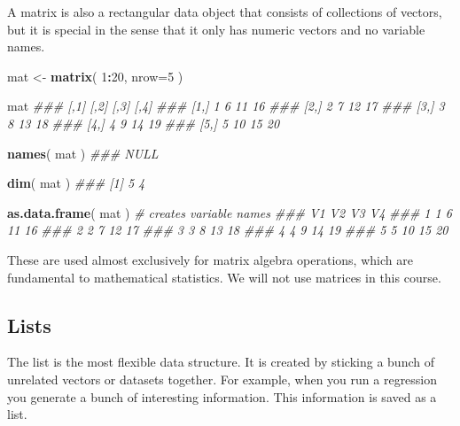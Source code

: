 \documentclass[]{book}
\newenvironment{Shaded}{\begin{snugshade}}{\end{snugshade}}
\newcommand{\CommentTok}[1]{\textcolor[rgb]{0.56,0.35,0.01}{\textit{#1}}}
\newcommand{\DataTypeTok}[1]{\textcolor[rgb]{0.13,0.29,0.53}{#1}}
\newcommand{\DecValTok}[1]{\textcolor[rgb]{0.00,0.00,0.81}{#1}}
\newcommand{\KeywordTok}[1]{\textcolor[rgb]{0.13,0.29,0.53}{\textbf{#1}}}
\newcommand{\NormalTok}[1]{#1}
\newcommand{\OperatorTok}[1]{\textcolor[rgb]{0.81,0.36,0.00}{\textbf{#1}}}
\newcommand{\StringTok}[1]{\textcolor[rgb]{0.31,0.60,0.02}{#1}}
\theoremstyle{definition}
\theoremstyle{definition}
\theoremstyle{definition}
\theoremstyle{remark}
\begin{document}
A matrix is also a rectangular data object that consists of collections
of vectors, but it is special in the sense that it only has numeric
vectors and no variable names.

\begin{Shaded}
\begin{Highlighting}[]

\NormalTok{mat <-}\StringTok{ }\KeywordTok{matrix}\NormalTok{( }\DecValTok{1}\OperatorTok{:}\DecValTok{20}\NormalTok{, }\DataTypeTok{nrow=}\DecValTok{5}\NormalTok{ )}

\NormalTok{mat}
\CommentTok{###      [,1] [,2] [,3] [,4]}
\CommentTok{### [1,]    1    6   11   16}
\CommentTok{### [2,]    2    7   12   17}
\CommentTok{### [3,]    3    8   13   18}
\CommentTok{### [4,]    4    9   14   19}
\CommentTok{### [5,]    5   10   15   20}

\KeywordTok{names}\NormalTok{( mat )}
\CommentTok{### NULL}

\KeywordTok{dim}\NormalTok{( mat )}
\CommentTok{### [1] 5 4}

\KeywordTok{as.data.frame}\NormalTok{( mat )  }\CommentTok{# creates variable names}
\CommentTok{###   V1 V2 V3 V4}
\CommentTok{### 1  1  6 11 16}
\CommentTok{### 2  2  7 12 17}
\CommentTok{### 3  3  8 13 18}
\CommentTok{### 4  4  9 14 19}
\CommentTok{### 5  5 10 15 20}
\end{Highlighting}
\end{Shaded}

These are used almost exclusively for matrix algebra operations, which
are fundamental to mathematical statistics. We will not use matrices in
this course.

\hypertarget{lists}{%
\subsection{Lists}\label{lists}}

The list is the most flexible data structure. It is created by sticking
a bunch of unrelated vectors or datasets together. For example, when you
run a regression you generate a bunch of interesting information. This
information is saved as a list.
\end{document}
